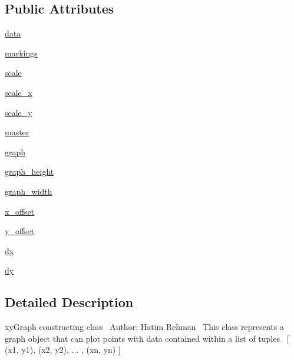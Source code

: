 \subsection*{Public Attributes}
\begin{DoxyCompactItemize}
\item 
\hyperlink{classxy_chart_1_1_graph_1_1_graph_a7b72c0a9156bafb64d165bed836dfa84}{data}
\item 
\hyperlink{classxy_chart_1_1_graph_1_1_graph_a23ef5e78c3fda8de89faa08b378dd29c}{markings}
\item 
\hyperlink{classxy_chart_1_1_graph_1_1_graph_ac6595d8e36f18b0e0eba912f974492b4}{scale}
\item 
\hyperlink{classxy_chart_1_1_graph_1_1_graph_a14290cdae8508d92d377b480874481e6}{scale\+\_\+x}
\item 
\hyperlink{classxy_chart_1_1_graph_1_1_graph_a4a09b7541a5bedb0eea71ac365d11660}{scale\+\_\+y}
\item 
\hyperlink{classxy_chart_1_1_graph_1_1_graph_a06da66a2d6259bacbb9b7d36614c7099}{master}
\item 
\hyperlink{classxy_chart_1_1_graph_1_1_graph_adfd89c5e9eb416eb62a5c0a6f338cf68}{graph}
\item 
\hyperlink{classxy_chart_1_1_graph_1_1_graph_a5cbbbef1602d0c3c496b3bc82ed40313}{graph\+\_\+height}
\item 
\hyperlink{classxy_chart_1_1_graph_1_1_graph_aad74f7976665c249c231e233ea6b4e97}{graph\+\_\+width}
\item 
\hyperlink{classxy_chart_1_1_graph_1_1_graph_a6a3fbe9a7cd5e8bb8b2bc48ea122173b}{x\+\_\+offset}
\item 
\hyperlink{classxy_chart_1_1_graph_1_1_graph_aa941de9b39790840703904995115f6b6}{y\+\_\+offset}
\item 
\hyperlink{classxy_chart_1_1_graph_1_1_graph_abc33a3b9c42054124e5ffb8a8a89460e}{dx}
\item 
\hyperlink{classxy_chart_1_1_graph_1_1_graph_a645f28960a2362dabf78c4ae5f7450e7}{dy}
\end{DoxyCompactItemize}


\subsection{Detailed Description}
xy\+Graph constructing class~\newline
 Author\+: Hatim Rehman~\newline
 This class represents a graph object that can plot points with data contained within a list of tuples~\newline
\mbox{[} (x1, y1), (x2, y2), ... , (xn, yn) \mbox{]} 

